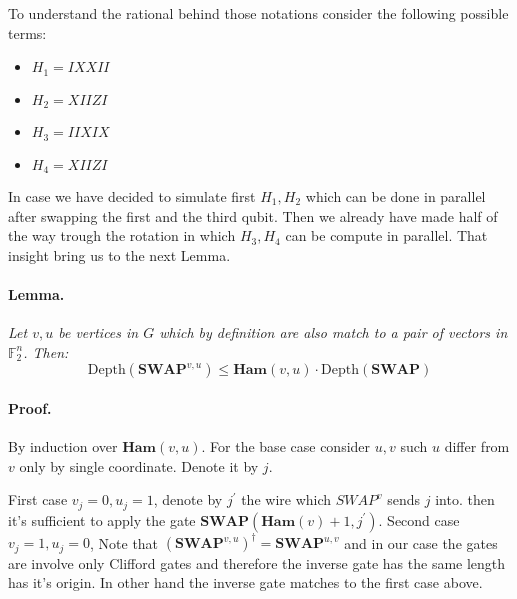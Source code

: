 \documentclass{article}
\begin{document}
\begin{multicols*}{2}
To understand the rational behind those notations consider the following  possible terms:
\begin{itemize}
    \item \(H_{1} = I  X  X  I  I \)
    \item \(H_{2} = X  I  I  Z  I \)
    \item \(H_{3} = I  I  X  I  X \)
    \item \(H_{4} = X  I  I  Z  I \)
\end{itemize} In case we have decided to simulate first \(H_{1},H_{2}\) which can be done in parallel after swapping the first and the third qubit. Then we already have made half of the way trough the rotation in which \(H_{3},H_{4}\) can be compute in parallel. That insight bring us to the next Lemma.     

\paragraph{Lemma.} \textit{ Let \(v,u\) be vertices in \(G\) which by definition are also match to a pair of vectors in \(\mathbb{F}_2^{n} \). Then:} 
\begin{equation*}
 \text{Depth}\left(\textbf{SWAP}^{v,u}\right) \le \textbf{Ham}(v,u)\cdot \text{Depth}\left(\textbf{SWAP}\right)
\end{equation*}

\paragraph{Proof.} By induction over \(\textbf{Ham}(v,u)\). For the base case consider \(u,v\) such \(u\) differ from \(v\) only by single coordinate. Denote it by \(j\).

First case \(v_j = 0, u_j =1\), denote by \(j^{\prime}\) the wire which \(SWAP^{v}\) sends \(j\) into. then it's sufficient to apply the gate \(\textbf{SWAP}(\textbf{Ham}(v) +1, j^\prime) \). Second case \(v_j = 1, u_j =0\), Note that \(\left(\textbf{SWAP}^{v,u}\right)^{\dagger}=\textbf{SWAP}^{u,v}\) and in our case the gates are involve only Clifford gates and therefore the inverse gate has the same length has it's origin. In other hand the inverse gate matches to the first case above.  


\end{multicols*}
\end{document}
